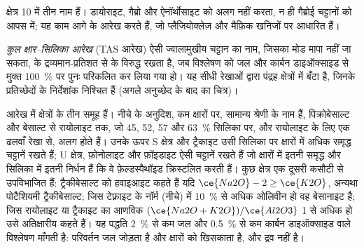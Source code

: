 \begin{omfigure}
\par{}
\end{omfigure}

क्षेत्र 10 में तीन नाम हैं।  डायोराइट, गैब्रो और
ऐनॉर्थोसाइट को अलग नहीं करता, न ही गैब्रोई चट्टानों को आपस में; यह काम आगे के आरेख करते हैं,
जो प्लैजियोक्लेज़ और मैफ़िक खनिजों पर आधारित हैं।

\begin{definition}[कुल क्षार--सिलिका आरेख]\label{def:b2:magmatic-series:tas}
\emph{कुल क्षार--सिलिका आरेख} (TAS
आरेख) ऐसी ज्वालामुखीय चट्टान का नाम, जिसका मोड मापा नहीं जा सकता,
 के द्रव्यमान-प्रतिशत से  के विरुद्ध रखता है, जब विश्लेषण को
जल और कार्बन डाइऑक्साइड से मुक्त \qty{100}{\percent} पर पुनः परिकलित कर लिया गया हो। यह
सीधी रेखाओं द्वारा पंद्रह क्षेत्रों में बँटा है, जिनके प्रतिच्छेदों के निर्देशांक निश्चित हैं
(अगले अनुच्छेद के बाद का चित्र)।
\end{definition}

आरेख में क्षेत्रों के तीन समूह हैं। नीचे के अनुदिश, कम क्षारों पर,
सामान्य श्रेणी के नाम हैं, पिक्रोबेसाल्ट और बेसाल्ट से रायोलाइट तक, जो 45, 52,
57 और \qty{63}{\percent} सिलिका पर, और रायोलाइट के लिए एक ढलवाँ रेखा से, अलग होते हैं। उनके ऊपर S क्षेत्र और ट्रैकाइट
उसी सिलिका पर क्षारों में अधिक समृद्ध चट्टानें रखते हैं; U क्षेत्र, फ़ोनोलाइट और फ़ॉइडाइट ऐसी चट्टानें रखते हैं जो
क्षारों में इतनी समृद्ध और सिलिका में इतनी निर्धन हैं कि वे फ़ेल्डस्पैथॉइड क्रिस्टलित करती हैं। कुछ क्षेत्र
एक दूसरी कसौटी से उपविभाजित हैं: ट्रैकीबेसाल्ट को हवाइआइट कहते हैं यदि $\ce{Na2O} - 2
\ge \ce{K2O}$, अन्यथा पोटैशियमी ट्रैकीबेसाल्ट; जिस टेफ़्राइट के नॉर्म (नीचे) में
\qty{10}{\percent} से अधिक ओलिवीन हो वह बेसानाइट है; जिस रायोलाइट या ट्रैकाइट का
आणविक $(\ce{Na2O + K2O})/\ce{Al2O3}$ 1 से अधिक हो उसे अतिक्षारीय कहते हैं। यह पद्धति
\qty{2}{\percent} से कम जल और \qty{0.5}{\percent} से कम
कार्बन डाइऑक्साइड वाले विश्लेषण माँगती है: परिवर्तन जल जोड़ता है और क्षारों को खिसकाता है, और 
द्रव नहीं है।

